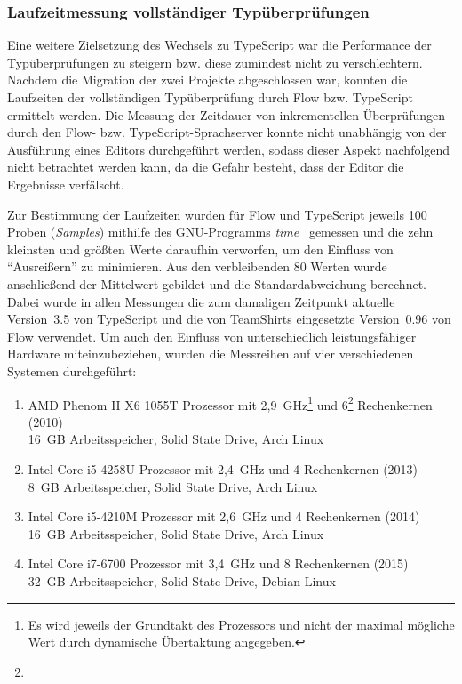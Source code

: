 \subsubsection{Laufzeitmessung vollständiger Typüberprüfungen}

Eine weitere Zielsetzung des Wechsels zu TypeScript war die Performance der Typüberprüfungen zu steigern bzw. diese zumindest nicht zu verschlechtern. Nachdem die Migration der zwei Projekte abgeschlossen war, konnten die Laufzeiten der vollständigen Typüberprüfung durch Flow bzw. TypeScript ermittelt werden. Die Messung der Zeitdauer von inkrementellen Überprüfungen durch den Flow- bzw. TypeScript-Sprachserver konnte nicht unabhängig von der Ausführung eines Editors  durchgeführt werden, sodass dieser Aspekt nachfolgend nicht betrachtet werden kann, da die Gefahr besteht, dass der Editor die Ergebnisse verfälscht.

Zur Bestimmung der Laufzeiten wurden für Flow und TypeScript jeweils 100 Proben (\textit{Samples}) mithilfe des GNU-Programms \textit{time}~\autocite{GNU_TIME} gemessen und die zehn kleinsten und größten Werte daraufhin verworfen, um den Einfluss von \enquote{Ausreißern} zu minimieren. Aus den verbleibenden 80 Werten wurde anschließend der Mittelwert gebildet und die Standardabweichung berechnet. Dabei wurde in allen Messungen die zum damaligen Zeitpunkt aktuelle Version~3.5 von TypeScript und die von TeamShirts eingesetzte Version~0.96 von Flow verwendet. Um auch den Einfluss von unterschiedlich leistungsfähiger Hardware miteinzubeziehen, wurden die Messreihen auf vier verschiedenen Systemen durchgeführt:

\begin{enumerate}[label=\Alph*.]
  \item AMD Phenom II X6 1055T Prozessor mit 2,9~GHz\footnote{Es wird jeweils der Grundtakt des Prozessors und nicht der maximal mögliche Wert durch dynamische Übertaktung angegeben.} und 6\footnote{} Rechenkernen (2010)\\16~GB Arbeitsspeicher, Solid State Drive, Arch Linux
  \item Intel Core i5-4258U Prozessor mit 2,4~GHz und 4 Rechenkernen (2013)\\8~GB Arbeitsspeicher, Solid State Drive, Arch Linux
  \item Intel Core i5-4210M Prozessor mit 2,6~GHz und 4 Rechenkernen (2014)\\16~GB Arbeitsspeicher, Solid State Drive, Arch Linux
  \item Intel Core i7-6700 Prozessor mit 3,4~GHz und 8 Rechenkernen (2015)\\32~GB Arbeitsspeicher, Solid State Drive, Debian Linux
\end{enumerate}

